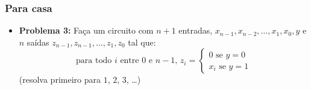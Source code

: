 \documentclass{beamer}
\begin{document}

\begin{frame}
\frametitle{Para casa}

\begin{itemize}
\item \textbf{Problema 3:} Faça um circuito com $n+1$ entradas,
$x_{n-1}, x_{n-2}, \ldots, x_1, x_0, y$ e $n$ saídas
$z_{n-1}, z_{n-1}, \ldots, z_1, z_0$ tal que:
$$
\text{para todo } i \text{ entre } 0 \text{ e } n-1 \text{, }
z_i = \left\{
 \begin{array}{l}
   0 \text{ se } y = 0 \\
   x_i \text{ se } y = 1
 \end{array} \right.
$$
(resolva primeiro para $1$, $2$, $3$, \ldots)
\end{itemize}

\pause

\begin{center}
%
%
%
\end{center}

\end{frame}
\end{document}

